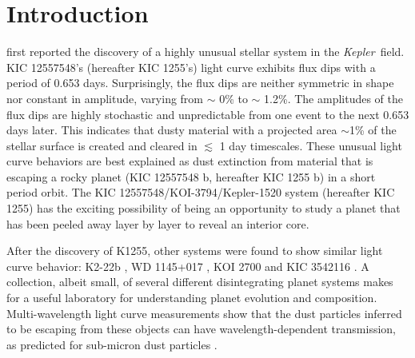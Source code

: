 \documentclass[preprint]{aastex61}
\newcommand{\sha}{KIC 1255 b}
\newcommand{\shStar}{KIC 1255}
\newcommand{\kepler}{{\it Kepler}}
\begin{document}



\section{Introduction}\label{sec:Intro}
\citet{rappaport} first reported the discovery of a highly unusual stellar system in the \kepler\ field.
KIC 12557548's (hereafter \shStar's) light curve exhibits flux dips with a period of 0.653 days.
Surprisingly, the flux dips are neither symmetric in shape nor constant in amplitude, varying from $\sim$ 0\% to $\sim$ 1.2\%.
The amplitudes of the flux dips are highly stochastic and unpredictable from one event to the next 0.653 days later.
This indicates that dusty material with a projected area $\sim$1\% of the stellar surface is created and cleared in $\lesssim$ 1 day timescales.
These unusual light curve behaviors are best explained as dust extinction from material that is escaping a rocky planet (KIC 12557548 b, hereafter \sha) in a short period orbit.
The KIC 12557548/KOI-3794/Kepler-1520 system (hereafter \shStar) has the exciting possibility of being an opportunity to study a planet that has been peeled away layer by layer to reveal an interior core.

After the discovery of K1255, other systems were found to show similar light curve behavior: K2-22b \citep{sanchis-ojedak2-22}, WD 1145+017 \citep{vanderburg2015wdDisintegrating}, KOI 2700 \citep{rappaport2014KOI2700} and KIC 3542116 \citep{rappaport2018exocomets}.
A collection, albeit small, of several different disintegrating planet systems makes for a useful laboratory for understanding planet evolution and composition.
Multi-wavelength light curve measurements show that the dust particles inferred to be escaping from these objects can have wavelength-dependent transmission, as predicted for sub-micron dust particles \citep{bochinski2015evolving,sanchis-ojedak2-22}.
\end{document}
